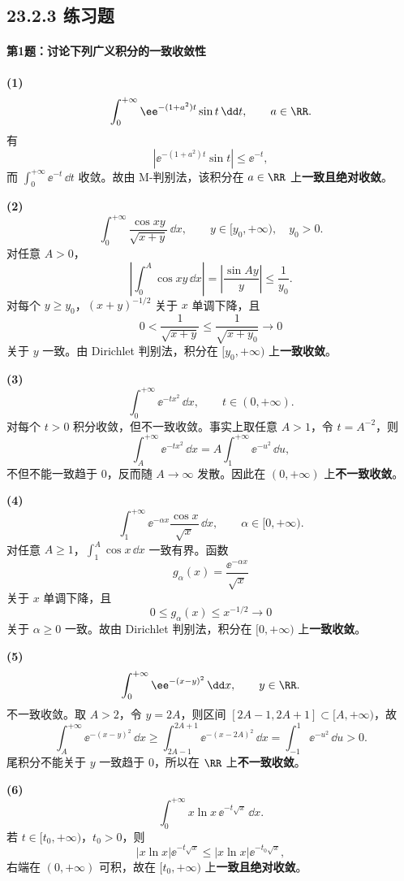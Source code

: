 \subsection*{23.2.3 练习题}

\paragraph{第1题：讨论下列广义积分的一致收敛性}

\begin{xsolution}
\textbf{(1)}
\[
\int_0^{+\infty}\ee^{-(1+a^2)t}\sin t\,\dd t,
\qquad a\in\RR.
\]
有
\[
|\ee^{-(1+a^2)t}\sin t|\leqslant\ee^{-t},
\]
而 $\int_0^{+\infty}\ee^{-t}\,\dd t$ 收敛。故由 M-判别法，该积分在 $a\in\RR$ 上\textbf{一致且绝对收敛}。

\textbf{(2)}
\[
\int_0^{+\infty}\frac{\cos xy}{\sqrt{x+y}}\,\dd x,
\qquad y\in[y_0,+\infty),\quad y_0>0.
\]
对任意 $A>0$，
\[
\left|\int_0^A\cos xy\,\dd x\right|
=\left|\frac{\sin Ay}{y}\right|\leqslant\frac1{y_0}.
\]
对每个 $y\geqslant y_0$，$(x+y)^{-1/2}$ 关于 $x$ 单调下降，且
\[
0<\frac1{\sqrt{x+y}}\leqslant\frac1{\sqrt{x+y_0}}\to0
\]
关于 $y$ 一致。由 Dirichlet 判别法，积分在 $[y_0,+\infty)$ 上\textbf{一致收敛}。

\textbf{(3)}
\[
\int_0^{+\infty}\ee^{-tx^2}\,\dd x,
\qquad t\in(0,+\infty).
\]
对每个 $t>0$ 积分收敛，但不一致收敛。事实上取任意 $A>1$，令 $t=A^{-2}$，则
\[
\int_A^{+\infty}\ee^{-tx^2}\,\dd x
=A\int_1^{+\infty}\ee^{-u^2}\,\dd u,
\]
不但不能一致趋于 $0$，反而随 $A\to\infty$ 发散。因此在 $(0,+\infty)$ 上\textbf{不一致收敛}。

\textbf{(4)}
\[
\int_1^{+\infty}\ee^{-\alpha x}\frac{\cos x}{\sqrt x}\,\dd x,
\qquad \alpha\in[0,+\infty).
\]
对任意 $A\geqslant1$，$\int_1^A\cos x\,\dd x$ 一致有界。函数
\[
g_\alpha(x)=\frac{\ee^{-\alpha x}}{\sqrt x}
\]
关于 $x$ 单调下降，且
\[
0\leqslant g_\alpha(x)\leqslant x^{-1/2}\to0
\]
关于 $\alpha\geqslant0$ 一致。故由 Dirichlet 判别法，积分在 $[0,+\infty)$ 上\textbf{一致收敛}。

\textbf{(5)}
\[
\int_0^{+\infty}\ee^{-(x-y)^2}\,\dd x,
\qquad y\in\RR.
\]
不一致收敛。取 $A>2$，令 $y=2A$，则区间 $[2A-1,2A+1]\subset[A,+\infty)$，故
\[
\int_A^{+\infty}\ee^{-(x-y)^2}\,\dd x
\geqslant\int_{2A-1}^{2A+1}\ee^{-(x-2A)^2}\,\dd x
=\int_{-1}^1\ee^{-u^2}\,\dd u>0.
\]
尾积分不能关于 $y$ 一致趋于 $0$，所以在 $\RR$ 上\textbf{不一致收敛}。

\textbf{(6)}
\[
\int_0^{+\infty}x\ln x\,\ee^{-t\sqrt x}\,\dd x.
\]
若 $t\in[t_0,+\infty)$，$t_0>0$，则
\[
|x\ln x|\ee^{-t\sqrt x}\leqslant |x\ln x|\ee^{-t_0\sqrt x},
\]
右端在 $(0,+\infty)$ 可积，故在 $[t_0,+\infty)$ 上\textbf{一致且绝对收敛}。


\end{xsolution}
